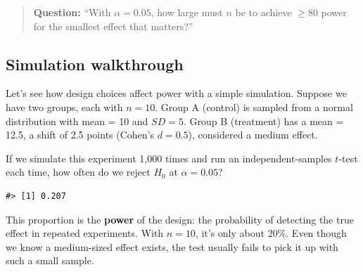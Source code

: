 \documentclass[
  letterpaper,
  DIV=11,
  numbers=noendperiod]{scrreprt}
\newenvironment{Shaded}{\begin{snugshade}}{\end{snugshade}}
\newcommand{\AttributeTok}[1]{\textcolor[rgb]{0.40,0.45,0.13}{#1}}
\newcommand{\ConstantTok}[1]{\textcolor[rgb]{0.56,0.35,0.01}{#1}}
\newcommand{\ControlFlowTok}[1]{\textcolor[rgb]{0.00,0.23,0.31}{\textbf{#1}}}
\newcommand{\DecValTok}[1]{\textcolor[rgb]{0.68,0.00,0.00}{#1}}
\newcommand{\FloatTok}[1]{\textcolor[rgb]{0.68,0.00,0.00}{#1}}
\newcommand{\FunctionTok}[1]{\textcolor[rgb]{0.28,0.35,0.67}{#1}}
\newcommand{\NormalTok}[1]{\textcolor[rgb]{0.00,0.23,0.31}{#1}}
\newcommand{\OtherTok}[1]{\textcolor[rgb]{0.00,0.23,0.31}{#1}}
\newcommand{\SpecialCharTok}[1]{\textcolor[rgb]{0.37,0.37,0.37}{#1}}
\begin{document}
\begin{quote}
\textbf{Question:} ``With \(\alpha = 0.05\), how large must \(n\) be to
achieve \(\ge 80%
\) power for the smallest effect that matters?''
\end{quote}

\subsection{Simulation walkthrough}\label{simulation-walkthrough}

Let's see how design choices affect power with a simple simulation.
Suppose we have two groups, each with \(n=10\). Group A (control) is
sampled from a normal distribution with mean = 10 and \(SD = 5\). Group
B (treatment) has a mean = 12.5, a shift of 2.5 points (Cohen's
\(d=0.5\)), considered a medium effect.

If we simulate this experiment 1,000 times and run an
independent-samples \(t\)-test each time, how often do we reject \(H_0\)
at \(\alpha=0.05\)?

\begin{Shaded}
\end{Shaded}

\begin{verbatim}
#> [1] 0.207
\end{verbatim}

This proportion is the \textbf{power} of the design: the probability of
detecting the true effect in repeated experiments. With \(n=10\), it's
only about 20\%. Even though we know a medium-sized effect exists, the
test usually fails to pick it up with such a small sample.
\end{document}
